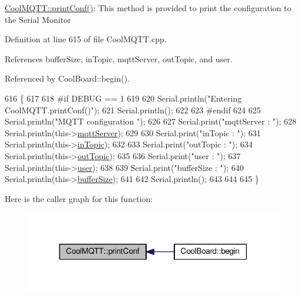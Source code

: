 \hyperlink{classCoolMQTT_a40553a0ad4b5ecf1cb4411ab54ca85fb}{Cool\+M\+Q\+T\+T\+::print\+Conf()}\+: This method is provided to print the configuration to the Serial Monitor 

Definition at line 615 of file Cool\+M\+Q\+T\+T.\+cpp.



References buffer\+Size, in\+Topic, mqtt\+Server, out\+Topic, and user.



Referenced by Cool\+Board\+::begin().


\begin{DoxyCode}
616 \{
617 
618 \textcolor{preprocessor}{#if DEBUG == 1 }
619 
620     Serial.println(\textcolor{stringliteral}{"Entering CoolMQTT.printConf()"});
621     Serial.println();   
622 
623 \textcolor{preprocessor}{#endif}
624     
625     Serial.println(\textcolor{stringliteral}{"MQTT configuration "});
626 
627     Serial.print(\textcolor{stringliteral}{"mqttServer : "});
628     Serial.println(this->\hyperlink{classCoolMQTT_ab8bb951f87ddbf92db74c2ad16a3e53e}{mqttServer});
629 
630     Serial.print(\textcolor{stringliteral}{"inTopic : "});
631     Serial.println(this->\hyperlink{classCoolMQTT_a4492f52a441e83cc5151010317fdb52d}{inTopic});
632 
633     Serial.print(\textcolor{stringliteral}{"outTopic : "});
634     Serial.println(this->\hyperlink{classCoolMQTT_a109c786a17b463f9eeba046194279522}{outTopic});
635 
636     Serial.print(\textcolor{stringliteral}{"user : "});
637     Serial.println(this->\hyperlink{classCoolMQTT_a8cd47e45d457f908d4b4390b35aaee83}{user});
638 
639     Serial.print(\textcolor{stringliteral}{"bufferSize : "});
640     Serial.println(this->\hyperlink{classCoolMQTT_a7f3cf26b51d6770f216e42c5ef13ca9f}{bufferSize});
641 
642     Serial.println();
643 
644 
645 \}
\end{DoxyCode}
Here is the caller graph for this function\+:
\nopagebreak
\begin{figure}[H]
\begin{center}
\leavevmode
\includegraphics[width=318pt]{classCoolMQTT_a40553a0ad4b5ecf1cb4411ab54ca85fb_icgraph}
\end{center}
\end{figure}
\mbox{\label{classCoolMQTT_ace977b3e90ab14b1199fe5c4fb0a13ec}} 
